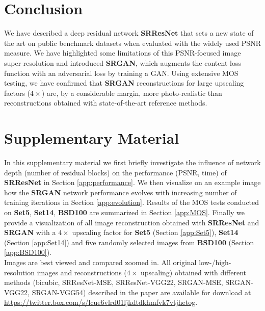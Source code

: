 \documentclass[10pt,twocolumn,letterpaper]{article}
\begin{document}
\section{Conclusion}
\label{sec:conclusion}
We have described a deep residual network \textbf{SRResNet} that sets a new state of the art on public benchmark datasets when evaluated with the widely used \ac{PSNR} measure. We have highlighted some limitations of this \ac{PSNR}-focused image super-resolution and introduced \textbf{SRGAN}, which augments the content loss function with an adversarial loss by training a \ac{GAN}. Using extensive \ac{MOS} testing, we have confirmed that \textbf{SRGAN} reconstructions for large upscaling factors ($4\times$) are, by a considerable margin, more photo-realistic than reconstructions obtained with state-of-the-art reference methods. 

{\footnotesize


}
\clearpage
\setcounter{section}{0}
\renewcommand{\thesection}{\Alph{section}}
\onecolumn
\section{Supplementary Material}
In this supplementary material we first briefly investigate the influence of network depth (number of residual blocks) on the performance (PSNR, time) of \textbf{SRResNet} in Section \ref{app:performance}. We then visualize on an example image how the \textbf{SRGAN} network performance evolves with increasing number of training iterations in Section \ref{app:evolution}. Results of the \ac{MOS} tests conducted on \textbf{Set5}, \textbf{Set14}, \textbf{BSD100} are summarized in Section \ref{app:MOS}. Finally we provide a visualization of all image reconstruction obtained with \textbf{SRResNet} and \textbf{SRGAN} with a $4\times$ upscaling factor for \textbf{Set5} (Section \ref{app:Set5}), \textbf{Set14} (Section \ref{app:Set14}) and five randomly selected images from \textbf{BSD100} (Section \ref{app:BSD100}).\\

Images are best viewed and compared zoomed in. All original low-/high-resolution images and reconstructions ($4\times$ upscaling) obtained with different methods (bicubic, SRResNet-MSE, SRResNet-VGG22, SRGAN-MSE, SRGAN-VGG22, SRGAN-VGG54) described in the paper are available for download at \url{https://twitter.box.com/s/lcue6vlrd01ljkdtdkhmfvk7vtjhetog}.

\clearpage
\end{document}
